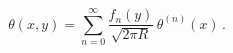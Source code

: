 \begin{equation}
\theta(x,y) = \sum_{n=0}^\infty \frac{f_n(y)}{\sqrt{2\pi R}}\,
\theta^{(n)}(x) \, .
\end{equation}

